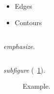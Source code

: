 \documentclass{SMBV12}
\begin{document}
\begin{itemize}
\item
	Edges
\item
	Contours
\end{itemize}


\subsection{}



\subsection{}


{\em emphasize}.

\subsection{}

{\em subfigure}  (\figurename~\ref{SMBV12_EMuster_fig01}).

\begin{figure}[b]
 	\centering
 		\caption{\label{SMBV12_EMuster_fig01} Example.}
\end{figure}
\end{document}
